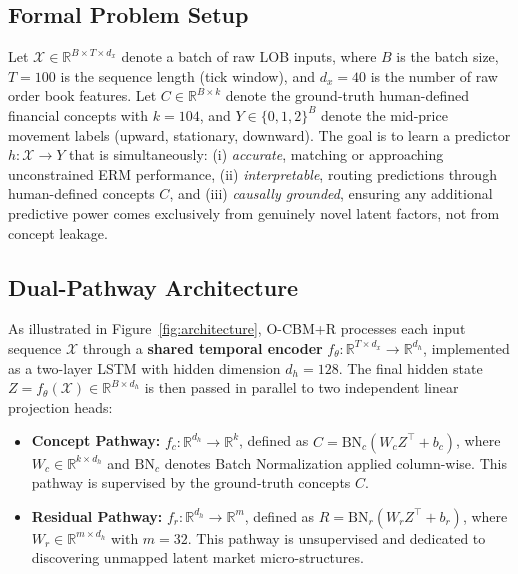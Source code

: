 \documentclass[twoside,11pt]{article}
\begin{document}
\subsection{Formal Problem Setup}

Let $\mathcal{X} \in \mathbb{R}^{B \times T \times d_x}$ denote a batch of raw LOB inputs, where $B$ is the batch size, $T = 100$ is the sequence length (tick window), and $d_x = 40$ is the number of raw order book features. Let $C \in \mathbb{R}^{B \times k}$ denote the ground-truth human-defined financial concepts with $k = 104$, and $Y \in \{0, 1, 2\}^B$ denote the mid-price movement labels (upward, stationary, downward). The goal is to learn a predictor $h: \mathcal{X} \rightarrow Y$ that is simultaneously: (i) \textit{accurate}, matching or approaching unconstrained ERM performance, (ii) \textit{interpretable}, routing predictions through human-defined concepts $C$, and (iii) \textit{causally grounded}, ensuring any additional predictive power comes exclusively from genuinely novel latent factors, not from concept leakage.

\subsection{Dual-Pathway Architecture}

As illustrated in Figure~\ref{fig:architecture}, O-CBM+R processes each input sequence $\mathcal{X}$ through a \textbf{shared temporal encoder} $f_\theta: \mathbb{R}^{T \times d_x} \rightarrow \mathbb{R}^{d_h}$, implemented as a two-layer LSTM with hidden dimension $d_h = 128$. The final hidden state $Z = f_\theta(\mathcal{X}) \in \mathbb{R}^{B \times d_h}$ is then passed in parallel to two independent linear projection heads:

\begin{itemize}
    \item \textbf{Concept Pathway:} $f_c: \mathbb{R}^{d_h} \rightarrow \mathbb{R}^{k}$, defined as $\hat{C} = \text{BN}_c(W_c Z^\top + b_c)$, where $W_c \in \mathbb{R}^{k \times d_h}$ and $\text{BN}_c$ denotes Batch Normalization applied column-wise. This pathway is supervised by the ground-truth concepts $C$.
    \item \textbf{Residual Pathway:} $f_r: \mathbb{R}^{d_h} \rightarrow \mathbb{R}^{m}$, defined as $R = \text{BN}_r(W_r Z^\top + b_r)$, where $W_r \in \mathbb{R}^{m \times d_h}$ with $m = 32$. This pathway is unsupervised and dedicated to discovering unmapped latent market micro-structures.
\end{itemize}
\end{document}
